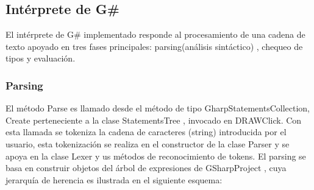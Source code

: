 \documentclass[a4paper, 12pt]{article}
\begin{document}
\newpage
\subsection{Intérprete de G\#}\label{}
El intérprete de G\# implementado responde al procesamiento de una cadena de texto apoyado en tres fases principales: parsing(análisis sintáctico) , chequeo de tipos y evaluación.
\subsubsection{Parsing}\label{}
El método Parse es llamado desde  el método de tipo GharpStatementsCollection, Create perteneciente a la clase StatementsTree , invocado en DRAWClick. Con esta llamada se tokeniza la cadena de caracteres (string) introducida por el usuario, esta tokenización se realiza en el constructor de la clase Parser y se apoya en la clase Lexer y us métodos de reconocimiento de tokens. El parsing se basa en construir objetos del árbol de expresiones de GSharpProject , cuya jerarquía de herencia es ilustrada en el siguiente esquema:
\end{document}
